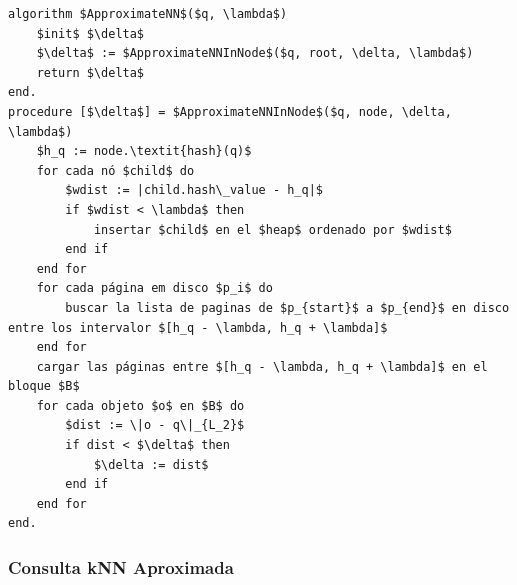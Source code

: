 \begin{lstlisting}[mathescape, frame=single, label=alg:HashFile,caption=Consulta kNN aproximada usando HashFile]
algorithm $ApproximateNN$($q, \lambda$)
    $init$ $\delta$
    $\delta$ := $ApproximateNNInNode$($q, root, \delta, \lambda$)
    return $\delta$
end.
procedure [$\delta$] = $ApproximateNNInNode$($q, node, \delta, \lambda$)
    $h_q := node.\textit{hash}(q)$
    for cada nó $child$ do
        $wdist := |child.hash\_value - h_q|$
        if $wdist < \lambda$ then
            insertar $child$ en el $heap$ ordenado por $wdist$
        end if
    end for
    for cada página em disco $p_i$ do
        buscar la lista de paginas de $p_{start}$ a $p_{end}$ en disco entre los intervalor $[h_q - \lambda, h_q + \lambda]$
    end for
    cargar las páginas entre $[h_q - \lambda, h_q + \lambda]$ en el bloque $B$
    for cada objeto $o$ en $B$ do
        $dist := \|o - q\|_{L_2}$
        if dist < $\delta$ then
            $\delta := dist$
        end if
    end for
end.
\end{lstlisting}

\subsubsection{Consulta kNN Aproximada}
 
